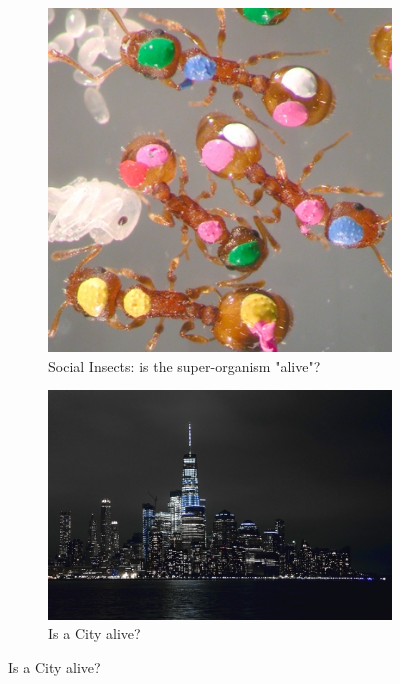 \documentclass[]{article}
\begin{document}
\begin{figure}[H]
	\caption{Scales of Life}
		\begin{subfigure}[t]{0.45\textwidth}
		\caption{Social Insects: is the super-organism "alive"?}\label{fig:social:insects}
		\includegraphics[width=\textwidth]{SocialInsects}
	\end{subfigure}
	\begin{subfigure}[t]{0.45\textwidth}
		\caption{Is a City alive?}\label{fig:city}
		\includegraphics[width=\textwidth]{City}
	\end{subfigure}	

\end{figure}
\end{document}
